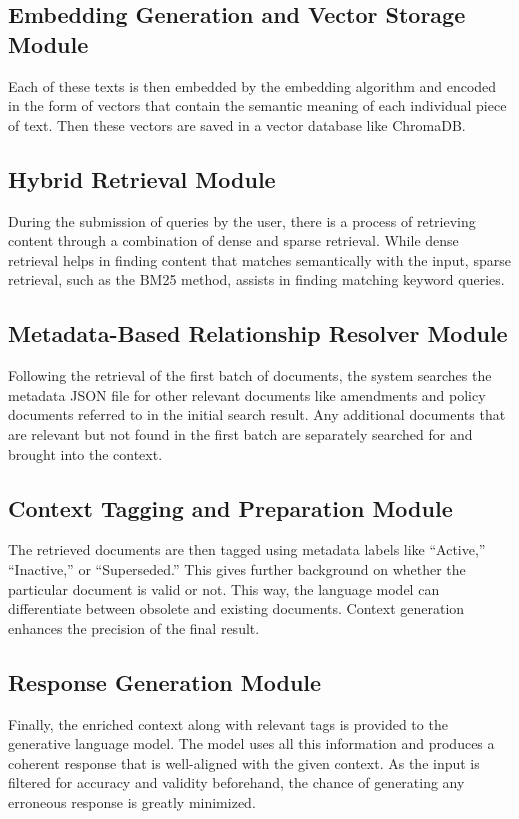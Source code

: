 \documentclass[conference]{IEEEtran}
\begin{document}
\subsection{Embedding Generation and Vector Storage Module}
Each of these texts is then embedded by the embedding algorithm and encoded in the form of vectors that contain the semantic meaning of each individual piece of text. Then these vectors are saved in a vector database like ChromaDB.

\subsection{Hybrid Retrieval Module}
During the submission of queries by the user, there is a process of retrieving content through a combination of dense and sparse retrieval. While dense retrieval helps in finding content that matches semantically with the input, sparse retrieval, such as the BM25 method, assists in finding matching keyword queries.

\subsection{Metadata-Based Relationship Resolver Module}
Following the retrieval of the first batch of documents, the system searches the metadata JSON file for other relevant documents like amendments and policy documents referred to in the initial search result. Any additional documents that are relevant but not found in the first batch are separately searched for and brought into the context.

\subsection{Context Tagging and Preparation Module}
The retrieved documents are then tagged using metadata labels like ``Active,'' ``Inactive,'' or ``Superseded.'' This gives further background on whether the particular document is valid or not. This way, the language model can differentiate between obsolete and existing documents. Context generation enhances the precision of the final result.

\subsection{Response Generation Module}
Finally, the enriched context along with relevant tags is provided to the generative language model. The model uses all this information and produces a coherent response that is well-aligned with the given context. As the input is filtered for accuracy and validity beforehand, the chance of generating any erroneous response is greatly minimized.
\end{document}
